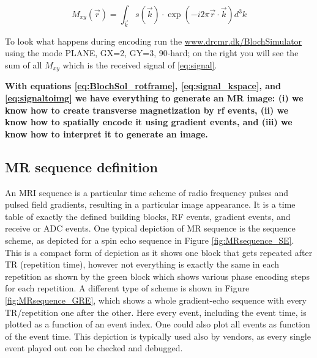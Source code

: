 \documentclass[a4paper,12pt]{extarticle}
\begin{document}
\begin{equation} \label{eq:signaltoimg}
   M_{xy}(\vec{r})=  \int_{\vec{k}} s(\vec{k})\cdot \exp(-i2\pi\vec{r}\cdot \vec{k}) d^3k
 \end{equation} 
 
 To look what happens during encoding run the  \href{http://www.drcmr.dk/BlochSimulator/}{www.drcmr.dk/BlochSimulator} using the mode PLANE, GX=2, GY=3, 90-hard; on the right you will see the sum of all $M_{xy}$ which is the received signal of \eqref{eq:signal}.
 
 
 \textbf{With equations \eqref{eq:BlochSol_rotframe}, \eqref{eq:signal_kspace}, and \eqref{eq:signaltoimg} we have everything to generate an MR image: (i) we know how to create transverse magnetization by rf events, (ii) we know how to spatially encode it using gradient events, and (iii) we know how to interpret it to generate an image.}
  \newpage
 
\subsection{MR sequence definition} \label{sec:MRseqdef}
An MRI sequence is a particular time scheme of radio frequency pulses and pulsed field gradients, resulting in a particular image appearance. It is a time table of exactly the defined building blocks, RF events, gradient events, and receive or ADC events. One typical depiction of MR sequence is the sequence scheme, as depicted for a spin echo sequence in Figure \ref{fig:MRsequence_SE}. This is a compact form of depiction as it shows one block that gets repeated after TR (repetition time), however not everything is exactly the same in each repetition as shown by the green block which shows various phase encoding steps for each repetition. A different type of scheme is shown in Figure \ref{fig:MRsequence_GRE}, which shows a whole gradient-echo sequence with every TR/repetition one after the other. Here every event, including the event time, is plotted as a function of an event index. One could also plot all events as function of the event time. This depiction is typically used also by vendors, as every single event played out con be checked and debugged.
\end{document}

